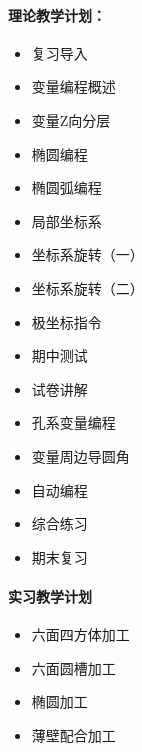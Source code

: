 \paragraph{理论教学计划：}
\begin{itemize}
	\item 复习导入

	\item 变量编程概述

	\item 变量Z向分层

	\item 椭圆编程

	\item 椭圆弧编程

	\item 局部坐标系

	\item 坐标系旋转（一）

	\item 坐标系旋转（二）

	\item 极坐标指令

	\item 期中测试

	\item 试卷讲解

	\item 孔系变量编程

	\item 变量周边导圆角

	\item 自动编程
	\item 综合练习

	\item 期末复习
\end{itemize}

\paragraph{实习教学计划}
\begin{itemize}
	\item 六面四方体加工

	\item 六面圆槽加工

	\item 椭圆加工

	\item 薄壁配合加工
\end{itemize}

